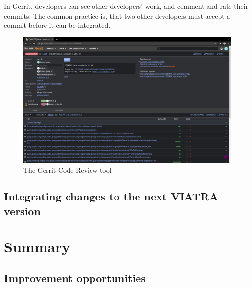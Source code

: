 \documentclass[11pt,a4paper,oneside]{report}
\begin{document}
In Gerrit, developers can see other developers' work, and comment and rate their
commits. The common practice is, that two other developers must accept a
commit before it can be integrated.

\begin{figure}[ht]
\centering
\includegraphics[width=150mm, keepaspectratio]{figures/gerrit.png}
\caption{The Gerrit Code Review tool}
\label{fig:gerrit}
\end{figure}

\section{Integrating changes to the next VIATRA version}

\chapter{Summary}

\section{Improvement opportunities}


\chapter*{\koszonetnyilvanitas}




\listoffigures{}
\listoftables{}



\label{page:last}
\end{document}
